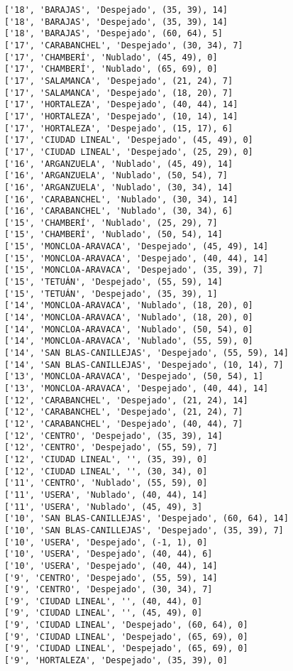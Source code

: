 \documentclass[11pt]{article}
\begin{document}
\begin{Verbatim}[commandchars=\\\{\}]
['18', 'BARAJAS', 'Despejado', (35, 39), 14]
['18', 'BARAJAS', 'Despejado', (35, 39), 14]
['18', 'BARAJAS', 'Despejado', (60, 64), 5]
['17', 'CARABANCHEL', 'Despejado', (30, 34), 7]
['17', 'CHAMBERÍ', 'Nublado', (45, 49), 0]
['17', 'CHAMBERÍ', 'Nublado', (65, 69), 0]
['17', 'SALAMANCA', 'Despejado', (21, 24), 7]
['17', 'SALAMANCA', 'Despejado', (18, 20), 7]
['17', 'HORTALEZA', 'Despejado', (40, 44), 14]
['17', 'HORTALEZA', 'Despejado', (10, 14), 14]
['17', 'HORTALEZA', 'Despejado', (15, 17), 6]
['17', 'CIUDAD LINEAL', 'Despejado', (45, 49), 0]
['17', 'CIUDAD LINEAL', 'Despejado', (25, 29), 0]
['16', 'ARGANZUELA', 'Nublado', (45, 49), 14]
['16', 'ARGANZUELA', 'Nublado', (50, 54), 7]
['16', 'ARGANZUELA', 'Nublado', (30, 34), 14]
['16', 'CARABANCHEL', 'Nublado', (30, 34), 14]
['16', 'CARABANCHEL', 'Nublado', (30, 34), 6]
['15', 'CHAMBERÍ', 'Nublado', (25, 29), 7]
['15', 'CHAMBERÍ', 'Nublado', (50, 54), 14]
['15', 'MONCLOA-ARAVACA', 'Despejado', (45, 49), 14]
['15', 'MONCLOA-ARAVACA', 'Despejado', (40, 44), 14]
['15', 'MONCLOA-ARAVACA', 'Despejado', (35, 39), 7]
['15', 'TETUÁN', 'Despejado', (55, 59), 14]
['15', 'TETUÁN', 'Despejado', (35, 39), 1]
['14', 'MONCLOA-ARAVACA', 'Nublado', (18, 20), 0]
['14', 'MONCLOA-ARAVACA', 'Nublado', (18, 20), 0]
['14', 'MONCLOA-ARAVACA', 'Nublado', (50, 54), 0]
['14', 'MONCLOA-ARAVACA', 'Nublado', (55, 59), 0]
['14', 'SAN BLAS-CANILLEJAS', 'Despejado', (55, 59), 14]
['14', 'SAN BLAS-CANILLEJAS', 'Despejado', (10, 14), 7]
['13', 'MONCLOA-ARAVACA', 'Despejado', (50, 54), 1]
['13', 'MONCLOA-ARAVACA', 'Despejado', (40, 44), 14]
['12', 'CARABANCHEL', 'Despejado', (21, 24), 14]
['12', 'CARABANCHEL', 'Despejado', (21, 24), 7]
['12', 'CARABANCHEL', 'Despejado', (40, 44), 7]
['12', 'CENTRO', 'Despejado', (35, 39), 14]
['12', 'CENTRO', 'Despejado', (55, 59), 7]
['12', 'CIUDAD LINEAL', '', (35, 39), 0]
['12', 'CIUDAD LINEAL', '', (30, 34), 0]
['11', 'CENTRO', 'Nublado', (55, 59), 0]
['11', 'USERA', 'Nublado', (40, 44), 14]
['11', 'USERA', 'Nublado', (45, 49), 3]
['10', 'SAN BLAS-CANILLEJAS', 'Despejado', (60, 64), 14]
['10', 'SAN BLAS-CANILLEJAS', 'Despejado', (35, 39), 7]
['10', 'USERA', 'Despejado', (-1, 1), 0]
['10', 'USERA', 'Despejado', (40, 44), 6]
['10', 'USERA', 'Despejado', (40, 44), 14]
['9', 'CENTRO', 'Despejado', (55, 59), 14]
['9', 'CENTRO', 'Despejado', (30, 34), 7]
['9', 'CIUDAD LINEAL', '', (40, 44), 0]
['9', 'CIUDAD LINEAL', '', (45, 49), 0]
['9', 'CIUDAD LINEAL', 'Despejado', (60, 64), 0]
['9', 'CIUDAD LINEAL', 'Despejado', (65, 69), 0]
['9', 'CIUDAD LINEAL', 'Despejado', (65, 69), 0]
['9', 'HORTALEZA', 'Despejado', (35, 39), 0]

\end{Verbatim}
\end{document}
